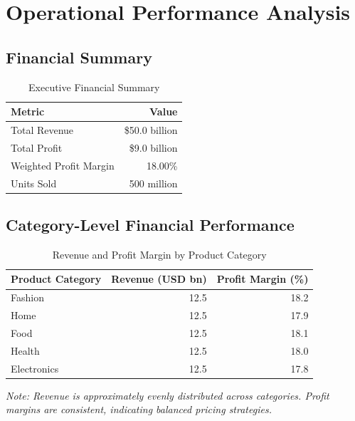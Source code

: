 \documentclass[11pt,a4paper]{article}
\begin{document}
\section{Operational Performance Analysis}

\subsection{Financial Summary}

\begin{table}[H]
\centering
\caption{Executive Financial Summary}
\label{tab:financial}
\begin{tabular}{@{}lr@{}}
\toprule
\textbf{Metric} & \textbf{Value} \\
\midrule
Total Revenue & \$50.0 billion \\
Total Profit & \$9.0 billion \\
Weighted Profit Margin & 18.00\% \\
Units Sold & 500 million \\
\bottomrule
\end{tabular}
\end{table}

\subsection{Category-Level Financial Performance}

\begin{table}[H]
\centering
\caption{Revenue and Profit Margin by Product Category}
\label{tab:category}
\begin{tabular}{@{}lrr@{}}
\toprule
\textbf{Product Category} & \textbf{Revenue (USD bn)} & \textbf{Profit Margin (\%)} \\
\midrule
Fashion & 12.5 & 18.2 \\
Home & 12.5 & 17.9 \\
Food & 12.5 & 18.1 \\
Health & 12.5 & 18.0 \\
Electronics & 12.5 & 17.8 \\
\bottomrule
\end{tabular}
\end{table}

\textit{Note: Revenue is approximately evenly distributed across categories. Profit margins are consistent, indicating balanced pricing strategies.}
\end{document}
